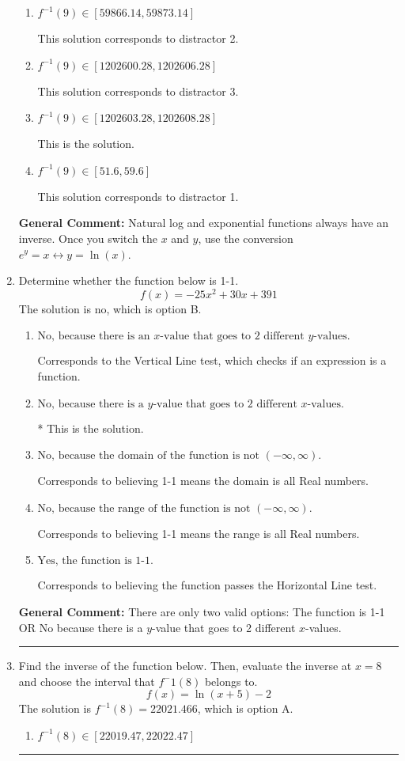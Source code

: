 \documentclass{extbook}[14pt]
\newcommand{\litem}[1]{\item #1

\rule{\textwidth}{0.4pt}}
\begin{document}
\begin{enumerate}
{\begin{enumerate}[label=\Alph*.]
 This solution corresponds to distractor 4.
\item \( f^{-1}(9) \in [59866.14, 59873.14] \)

 This solution corresponds to distractor 2.
\item \( f^{-1}(9) \in [1202600.28, 1202606.28] \)

 This solution corresponds to distractor 3.
\item \( f^{-1}(9) \in [1202603.28, 1202608.28] \)

 This is the solution.
\item \( f^{-1}(9) \in [51.6, 59.6] \)

 This solution corresponds to distractor 1.
\end{enumerate}

\textbf{General Comment:} Natural log and exponential functions always have an inverse. Once you switch the $x$ and $y$, use the conversion $ e^y = x \leftrightarrow y=\ln(x)$.
}
\litem{
Determine whether the function below is 1-1.
\[ f(x) = -25 x^2 + 30 x + 391 \]The solution is \( \text{no} \), which is option B.\begin{enumerate}[label=\Alph*.]
\item \( \text{No, because there is an $x$-value that goes to 2 different $y$-values.} \)

Corresponds to the Vertical Line test, which checks if an expression is a function.
\item \( \text{No, because there is a $y$-value that goes to 2 different $x$-values.} \)

* This is the solution.
\item \( \text{No, because the domain of the function is not $(-\infty, \infty)$.} \)

Corresponds to believing 1-1 means the domain is all Real numbers.
\item \( \text{No, because the range of the function is not $(-\infty, \infty)$.} \)

Corresponds to believing 1-1 means the range is all Real numbers.
\item \( \text{Yes, the function is 1-1.} \)

Corresponds to believing the function passes the Horizontal Line test.
\end{enumerate}

\textbf{General Comment:} There are only two valid options: The function is 1-1 OR No because there is a $y$-value that goes to 2 different $x$-values.
}
\litem{
Find the inverse of the function below. Then, evaluate the inverse at $x = 8$ and choose the interval that $f^-1(8)$ belongs to.
\[ f(x) = \ln{(x+5)}-2 \]The solution is \( f^{-1}(8) = 22021.466 \), which is option A.\begin{enumerate}[label=\Alph*.]
\item \( f^{-1}(8) \in [22019.47, 22022.47] \)


\end{enumerate}}
\end{enumerate}
\end{document}
